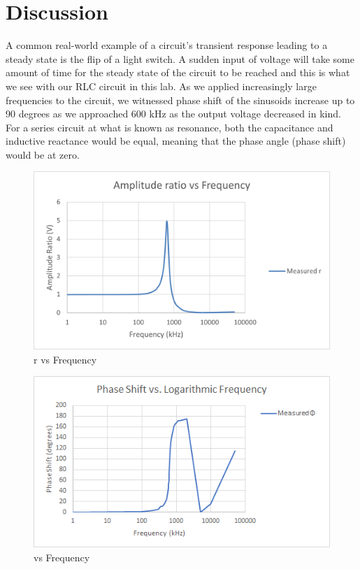 \documentclass[10pt,twocolumn]{article}
\begin{document}
\section{Discussion}

A common real-world example of a circuit’s transient response leading to a steady state is the flip of a light switch. A sudden input of voltage will take some amount of time for the steady state of the circuit to be reached and this is what we see with our RLC circuit in this lab. As we applied increasingly large frequencies to the circuit, we witnessed phase shift of the sinusoids increase up to 90 degrees as we approached 600 kHz as the output voltage decreased in kind. For a series circuit at what is known as resonance, both the capacitance and inductive reactance would be equal, meaning that the phase angle (phase shift) would be at zero.  

\begin{figure}[bt]
	\centering
	\includegraphics[width=.9\linewidth]{figures/rvsF.png}
	\caption{r vs Frequency}
	\label{fig:rvsF}
\end{figure}

\begin{figure}[bt]
	\centering
	\includegraphics[width=.9\linewidth]{figures/phivsF.png}
	\caption{\Phi vs Frequency}
	\label{fig:phivsF}
\end{figure}
\end{document}
